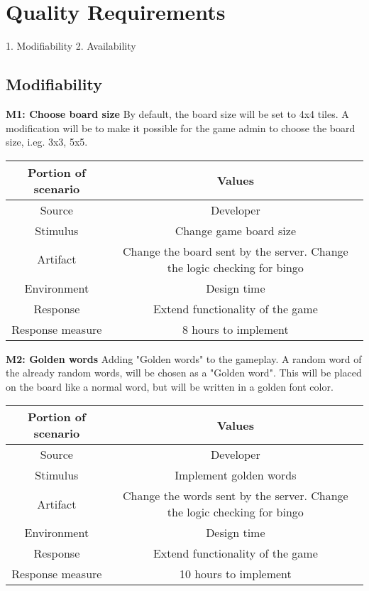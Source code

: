 \section{Quality Requirements}

1. Modifiability
2. Availability

\subsection{Modifiability}

{\bf M1: Choose board size}
By default, the board size will be set to 4x4 tiles. 
A modification will be to make it possible for the game admin to choose the board size, i.eg. 3x3, 5x5. 

\begin{tabular}{|c|c|}
\hline
{\bf Portion of scenario} & {\bf Values} \\ \hline
Source & Developer \\ \hline
Stimulus & Change game board size \\ \hline
Artifact & Change the board sent by the server. Change the logic
checking for bingo \\ \hline
Environment & Design time \\ \hline
Response & Extend functionality of the game \\ \hline
Response measure & 8 hours to implement \\ \hline
\end{tabular}
\newline

{\bf M2: Golden words}
Adding "Golden words" to the gameplay. A random word of the already random words, will be chosen as a "Golden word". This will be placed on the board like a normal word, but will be written in a golden font color. 

\begin{tabular}{|c|c|}
\hline
{\bf Portion of scenario} & {\bf Values} \\ \hline
Source & Developer \\ \hline
Stimulus & Implement golden words \\ \hline
Artifact & Change the words sent by the server. Change the logic
checking for bingo \\ \hline
Environment & Design time \\ \hline
Response & Extend functionality of the game \\ \hline
Response measure & 10 hours to implement \\ \hline
\end{tabular}

